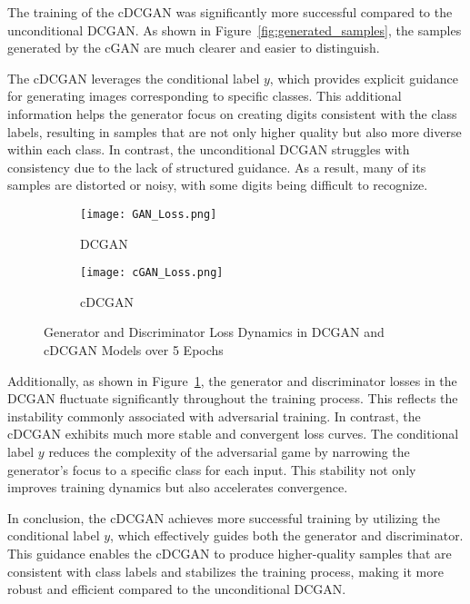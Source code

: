 \documentclass{rapportECL}
\begin{document}
\begin{description}
The training of the cDCGAN was significantly more successful compared to the unconditional DCGAN. As shown in Figure~\ref{fig:generated_samples}, the samples generated by the cGAN are much clearer and easier to distinguish. 

The cDCGAN leverages the conditional label \( y \), which provides explicit guidance for generating images corresponding to specific classes. This additional information helps the generator focus on creating digits consistent with the class labels, resulting in samples that are not only higher quality but also more diverse within each class. In contrast, the unconditional DCGAN struggles with consistency due to the lack of structured guidance. As a result, many of its samples are distorted or noisy, with some digits being difficult to recognize.

\begin{figure}[H]
    \centering
    \begin{subfigure}[b]{0.49\textwidth}
        \centering
        \texttt{[image: GAN\_Loss.png]}
        \caption{DCGAN}
    \end{subfigure}
    \hfill
    \begin{subfigure}[b]{0.49\textwidth}
        \centering
        \texttt{[image: cGAN\_Loss.png]}
        \caption{cDCGAN}
    \end{subfigure}
    \caption{Generator and Discriminator Loss Dynamics in DCGAN and cDCGAN Models over 5 Epochs}
    \label{fig:loss_dynamics}
\end{figure}

Additionally, as shown in Figure~\ref{fig:loss_dynamics}, the generator and discriminator losses in the DCGAN fluctuate significantly throughout the training process. This reflects the instability commonly associated with adversarial training. In contrast, the cDCGAN exhibits much more stable and convergent loss curves. The conditional label \( y \) reduces the complexity of the adversarial game by narrowing the generator’s focus to a specific class for each input. This stability not only improves training dynamics but also accelerates convergence.

In conclusion, the cDCGAN achieves more successful training by utilizing the conditional label \( y \), which effectively guides both the generator and discriminator. This guidance enables the cDCGAN to produce higher-quality samples that are consistent with class labels and stabilizes the training process, making it more robust and efficient compared to the unconditional DCGAN.


\end{description}
\end{document}
